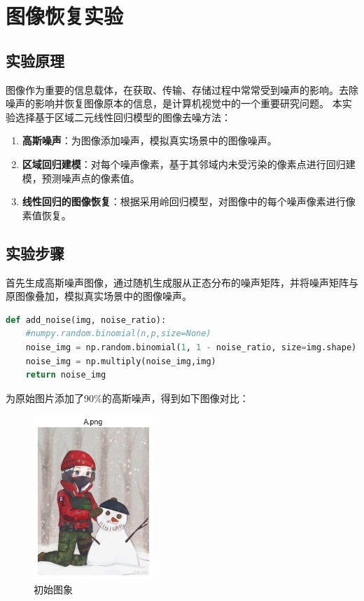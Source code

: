 \documentclass[12pt]{ctexart}
\begin{document}
\newpage

\section*{图像恢复实验}

\subsection*{实验原理}

图像作为重要的信息载体，在获取、传输、存储过程中常常受到噪声的影响。去除噪声的影响并恢复图像原本的信息，是计算机视觉中的一个重要研究问题。
本实验选择基于区域二元线性回归模型的图像去噪方法：

\begin{enumerate}
    \item \textbf{高斯噪声}：为图像添加噪声，模拟真实场景中的图像噪声。
    \item \textbf{区域回归建模}：对每个噪声像素，基于其邻域内未受污染的像素点进行回归建模，预测噪声点的像素值。
    \item \textbf{线性回归的图像恢复}：根据采用岭回归模型，对图像中的每个噪声像素进行像素值恢复。
\end{enumerate}

\subsection*{实验步骤}

首先生成高斯噪声图像，通过随机生成服从正态分布的噪声矩阵，并将噪声矩阵与原图像叠加，模拟真实场景中的图像噪声。

\begin{lstlisting}[language=Python,caption={生成高斯噪声}]
def add_noise(img, noise_ratio):
    #numpy.random.binomial(n,p,size=None)
    noise_img = np.random.binomial(1, 1 - noise_ratio, size=img.shape) 
    noise_img = np.multiply(noise_img,img)
    return noise_img
\end{lstlisting}
为原始图片添加了90\%的高斯噪声，得到如下图像对比：
\begin{figure}[H]
    \centering
    \includegraphics[width=0.4\textwidth]{image/3.png}
    \caption{初始图象}
\end{figure}
\end{document}
